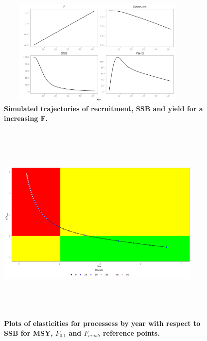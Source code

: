 \documentclass[10pt]{article}
\begin{document}
\begin{figure}[!ht]
\begin{center}
\includegraphics[height=2.1in, width=4in]{fig3.png}
\end{center}
\caption{\bf{Simulated trajectories of recruitment, SSB and yield for a increasing F.}}
\label{Figure_label_3}
\end{figure}

\begin{figure}[!ht]
\begin{center}
\includegraphics[height=4in, width=4in]{fig4.png}
\end{center}
\caption{\bf{Plots of elasticities for processess by year with respect to SSB for  MSY, $F_{0.1}$ and $F_{crash}$ reference points.}}
\label{Figure_label_4}
\end{figure}
\end{document}

